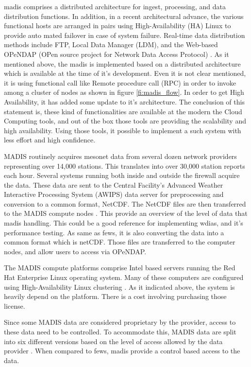 \acrshort{madis} comprises a distributed architecture for ingest, processing, and data distribution functions.
In addition, in a recent architectural advance, the various functional hosts are arranged in pairs using High-Availability (HA) Linux to provide auto mated failover in case of system failure. Real-time data distribution methods include FTP, Local Data Manager (LDM), and the Web-based OPeNDAP (OPen source project for Network Data Access Protocol) \cite{Macdermaid2005ARCHITECTUREP2.39}. As it mentioned above, the \acrshort{madis} is implemented based on a distributed architecture which is available at the time of it's development. Even it is not clear mentioned, it is using functional call like Remote procedure call (RPC) in order to invoke among a cluster of nodes as shown in figure \ref{fi:madis_flow}. In order to get High Availability, it has added some update to it's architecture. The conclusion of this statement is, these kind of functionalities are available at the modern the Cloud Computing tools, and out of the box those tools are providing the scalability and high availability. Using those tools, it possible to implement a such system with less effort and high confidence.

MADIS routinely acquires mesonet data from several dozen network providers representing over 14,000 stations. This translates into over 30,000 station reports each hour. Several systems running both inside and outside the firewall acquire the data. These data are sent to the Central Facility's Advanced Weather Interactive Processing System (AWIPS) data server for preprocessing and conversion to a common format, NetCDF. The NetCDF files are then transferred to the MADIS compute nodes \cite{Macdermaid2005ARCHITECTUREP2.39}. This provide an overview of the level of data that \acrshort{madis} handling. This could be a good reference for implementing \acrshort{wdias}, and it's performance testing. As same as \acrshort{fews}, it is also converting the data into a common format which is \acrshort{netCDF}. Those files are transferred to the computer nodes, and allow users to access via OPeNDAP.

The MADIS compute platforms comprise Intel based servers running the Red Hat Enterprise Linux operating system. Many of these computers are configured using High-Availability Linux clustering \cite{Macdermaid2005ARCHITECTUREP2.39}. As it indicated above, the system is heavily depend on the platform. There is a cost involving purchasing those license.

Since some MADIS data are considered proprietary by the provider, access to these data need to be controlled. To accommodate this, MADIS data are split into six different versions based on the level of access allowed by the data provider \cite{Macdermaid2005ARCHITECTUREP2.39}. When compared to \acrshort{fews}, \acrshort{madis} provide a control based access to the data.



